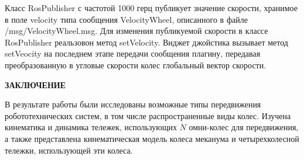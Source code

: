 \documentclass[oneside,final,14pt]{extreport}
\begin{document}
 Класс RosPublisher с частотой 1000 герц публикует значение скорости, хранимое в поле velocity типа сообщения VelocityWheel,  описанного в файле /msg/VelocityWheel.msg. Для изменения публикуемой скорости в классе RosPublisher реальзовон метод setVelocity. Виджет джойстика вызывает метод setVeocity на последнем этапе передачи сообщения плагину, передавая преобразованную в угловые скорости колес глобальный вектор скорости.
 
  

\iffalse
\section{Моделирование управляемой голономной тележки}
\subsection{Определение движения тележки посредством плагинов Gazebo}
\section{Реализация управления моделируемой тележки}
\subsection{Управление тележкой посредством джостика}
\subsection{Реализация движения тележки по аналитически заданному пути}
\fi

\newpage
{}
\begin{center}
\bfseries ЗАКЛЮЧЕНИЕ
\end{center}

В результате работы были исследованы возможные типы передвижения робототехнических систем, в том числе распространенные виды колес. Изучена кинематика и динамика тележек, использующих $N$ омни-колес для передвижения, а также представлена кинематическая модель колеса меканума и четырехколесной тележки, использующей эти колеса. 
\end{document}
